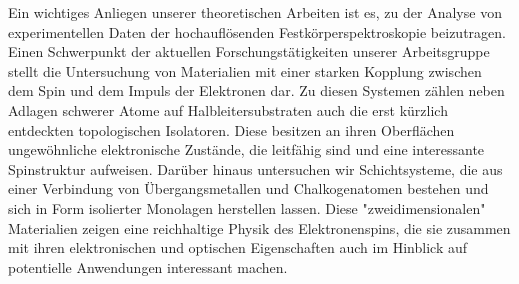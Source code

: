 \begin{multicols}{2}
Ein wichtiges Anliegen unserer theoretischen Arbeiten ist es, zu der Analyse von experimentellen Daten der hochauflösenden Festkörperspektroskopie beizutragen.
Einen Schwerpunkt der aktuellen Forschungstätigkeiten unserer Arbeitsgruppe stellt die Untersuchung von Materialien mit einer starken Kopplung zwischen dem Spin und dem Impuls der Elektronen dar.
Zu diesen Systemen zählen neben Adlagen schwerer Atome auf Halbleitersubstraten auch die erst kürzlich entdeckten topologischen Isolatoren.
Diese besitzen an ihren Oberflächen ungewöhnliche elektronische Zustände, die leitfähig sind und eine interessante Spinstruktur aufweisen.
Darüber hinaus untersuchen wir Schichtsysteme, die aus einer Verbindung von Übergangsmetallen und Chalkogenatomen bestehen und sich in Form isolierter Monolagen herstellen lassen.
Diese "zweidimensionalen" Materialien zeigen eine reichhaltige Physik des Elektronenspins, die sie zusammen mit ihren elektronischen und optischen Eigenschaften auch im Hinblick auf potentielle Anwendungen interessant machen.

\smallskip

\begin{center}
\end{center}
\end{multicols}

\clearpage

